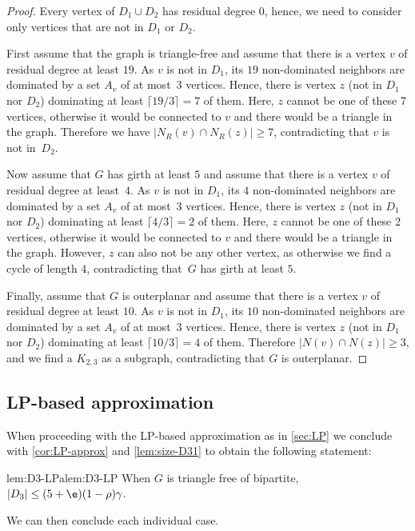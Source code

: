 \begin{proof}
  Every vertex of $D_1\cup D_2$ has residual degree $0$, hence, we
  need to consider only vertices that are not in $D_1$ or $D_2$.

  First assume that the graph is triangle-free and
  assume that there is a vertex $v$ of residual degree at least $19$.
  As $v$ is not in $D_1$, its $19$ non-dominated
  neighbors are dominated by a
  set $A_v$ of at most~3 vertices. Hence, there is vertex $z$ (not in $D_1$
  nor $D_2$) dominating at least $\lceil 19/3\rceil = 7$ of them.
  Here, $z$ cannot be one of these 7 vertices, otherwise it would be connected
  to $v$ and there would be a triangle in the graph.
  Therefore we
  have $|N_R(v)\cap N_R(z)|\geq 7$, contradicting that $v$ is not in~$D_2$.

  Now assume that $G$ has girth at least $5$ and
  assume that there is a vertex $v$ of residual degree at least~$4$.
  As $v$ is not in $D_1$, its $4$ non-dominated
  neighbors are dominated by a
  set $A_v$ of at most~3 vertices. Hence, there is vertex $z$ (not in $D_1$
  nor $D_2$) dominating at least $\lceil 4/3\rceil = 2$ of them.
  Here, $z$ cannot be one of these 2 vertices, otherwise it would be connected
  to $v$ and there would be a triangle in the graph. However, $z$ can
  also not be any other vertex, as otherwise we find a cycle of length $4$,
  contradicting that~$G$ has girth at least $5$.

  Finally, assume that $G$ is outerplanar and
  assume that there is a vertex $v$ of residual degree at least $10$.
  As $v$ is not in $D_1$, its $10$ non-dominated
  neighbors are dominated by a
  set $A_v$ of at most~3 vertices. Hence, there is vertex $z$ (not in $D_1$
  nor $D_2$) dominating at least $\lceil 10/3\rceil = 4$ of them.
  Therefore $|N(v)\cap N(z)|\geq 3$, and we find a $K_{2,3}$ as a
  subgraph, contradicting that $G$ is outerplanar.
\end{proof}

\subsection{LP-based approximation}

When proceeding with the LP-based approximation as in \cref{sec:LP}
we conclude with \cref{cor:LP-approx} and \cref{lem:size-D31} to obtain the
following statement:
\begin{adapted}{lem:D3-LP}{alem:D3-LP}
  When $G$ is triangle free of bipartite, $|D_3|\le (5+\e)(1-\rho)\gamma$.
\end{adapted}
We can then conclude each individual case.




